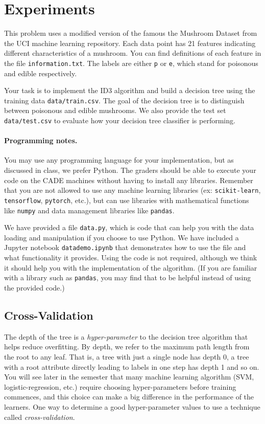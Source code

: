 
\section{Experiments}

This problem uses a modified version of the famous the Mushroom Dataset from the
UCI machine learning repository. Each data point has 21 features indicating
different characteristics of a mushroom. You can find definitions of each
feature in the file \texttt{information.txt}. The labels are either \texttt{p}
or \texttt{e}, which stand for poisonous and edible respectively.

Your task is to implement the ID3 algorithm and build a decision tree using the
training data \texttt{data/train.csv}. The goal of the decision tree is to
distinguish between poisonous and edible mushrooms. We also provide the test set
\texttt{data/test.csv} to evaluate how your decision tree classifier is
performing.


\paragraph{Programming notes.} You may use any programming language for your
implementation, but as discussed in class, we prefer Python. The graders should
be able to execute your code on the CADE machines without having to install any
libraries.  Remember that you are not allowed to use any machine learning
libraries (ex: \texttt{scikit-learn}, \texttt{tensorflow}, \texttt{pytorch},
etc.), but can use libraries with mathematical functions like \texttt{numpy} and
data management libraries like \texttt{pandas}.

We have provided a file \texttt{data.py}, which is code that can help you with
the data loading and manipulation if you choose to use Python. We have included
a Jupyter notebook \texttt{datademo.ipynb} that demonstrates how to use the file
and what functionality it provides. Using the code is not required, although we
think it should help you with the implementation of the algorithm. (If you are
familiar with a library such as \texttt{pandas}, you may find that to be helpful
instead of using the provided code.)

\subsection*{Cross-Validation}

The depth of the tree is a \emph{hyper-parameter} to the decision tree algorithm
that helps reduce overfitting. By depth, we refer to the maximum path length
from the root to any leaf. That is, a tree with just a single node has depth 0,
a tree with a root attribute directly leading to labels in one step has depth 1
and so on. You will see later in the semester that many machine learning
algorithm (SVM, logistic-regression, etc.) require choosing hyper-parameters
before training commences, and this choice can make a big difference in the
performance of the learners.  One way to determine a good hyper-parameter values
to use a technique called \emph{cross-validation}.

